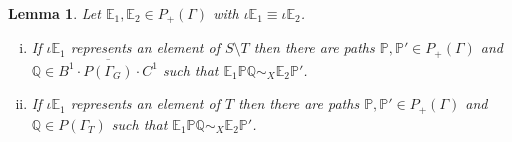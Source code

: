 \documentclass[11pt]{amsart}
\newtheorem{lem}{Lemma}
\theoremstyle{plain}
\begin{document}
\begin{lem}\label{Lemma4}
Let ${\mathbb{E}}_1, {\mathbb{E}}_2 \in P_+(\Gamma)$ with $\iota {\mathbb{E}}_1 \equiv \iota {\mathbb{E}}_2$.
\begin{enumerate}[(i)]
\item If $\iota {\mathbb{E}}_1$ represents an element of $S \setminus T$ then there are paths ${\mathbb{P}},{\mathbb{P}}' \in P_+(\Gamma)$ and ${\mathbb{Q}} \in \overline{B^1 \cdot P(\Gamma_G) \cdot C^1}$ such that ${\mathbb{E}}_1 {\mathbb{P}} {\mathbb{Q}} \sim_X {\mathbb{E}}_2 {\mathbb{P}}'$.
\item If $\iota {\mathbb{E}}_1$ represents an element of $T$ then there are paths ${\mathbb{P}},{\mathbb{P}}' \in P_+(\Gamma)$ and ${\mathbb{Q}} \in P(\Gamma_T)$ such that ${\mathbb{E}}_1 {\mathbb{P}} {\mathbb{Q}} \sim_X {\mathbb{E}}_2 {\mathbb{P}}'$.
\end{enumerate}
\end{lem}
\end{document}
